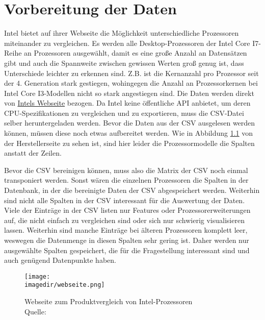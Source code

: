 \chapter{Vorbereitung der Daten}

Intel bietet auf ihrer Webseite die Möglichkeit unterschiedliche Prozessoren miteinander zu vergleichen.
Es werden alle Desktop-Prozessoren der Intel Core I7-Reihe an Prozessoren ausgewählt, damit es eine große Anzahl an Datensätzen gibt und auch die Spannweite zwischen gewissen Werten groß genug ist, dass Unterschiede leichter zu erkennen sind.
Z.B. ist die Kernanzahl pro Prozessor seit der 4. Generation stark gestiegen, wohingegen die Anzahl an Prozessorkernen bei Intel Core I3-Modellen nicht so stark angestiegen sind.
Die Daten werden direkt von \href{https://www.intel.de/content/www/de/de/products/compare.html?productIds=212279,212280,212047,212048,212251,199325,199335,199314,199316,199318,191048,191792,193738,190885,186604,148263,140642,126684,97129,93339,88200,88195,87718,88040,80807,80808,80809,80814,80806,77656,76642,75121,75122,75123,75124,75125,236781,236794,236854,236783,236789,230492,230490,230491,230500,230489,134596,134591,134592,134594,134595,129948,126686,97122,97128,88196}{Intels Webseite} bezogen.
Da Intel keine öffentliche API anbietet, um deren CPU-Spezifikationen zu vergleichen und zu exportieren, muss die CSV-Datei selber heruntergeladen werden. 
Bevor die Daten aus der CSV ausgelesen werden können, müssen diese noch etwas aufbereitet werden.
Wie in Abbildung \ref{fig:intel_webseite} von der Herstellerseite zu sehen ist, sind hier leider die Prozessormodelle die Spalten anstatt der Zeilen. 


Bevor die CSV bereinigen können, muss also die  Matrix der CSV noch einmal transponiert werden.
Sonst wären die einzelnen Prozessoren die Spalten in der Datenbank, in der die bereinigte Daten der CSV abgespeichert werden.
Weiterhin sind nicht alle Spalten in der CSV interessant für die Auswertung der Daten.
Viele der Einträge in der CSV listen nur Features oder Prozessorerweiterungen auf, die nicht einfach zu vergleichen sind oder sich nur schwierig visualisieren lassen.
Weiterhin sind manche Einträge bei älteren Prozessoren komplett leer, weswegen die Datenmenge in diesen Spalten sehr gering ist.
Daher werden nur ausgewählte Spalten gespeichert, die für die Fragestellung interessant sind und auch genügend Datenpunkte haben.

\cleardoublepage

\begin{figure}
	\centering 
	\texttt{[image: \\imagedir/webseite.png]} 
	\captionsetup{format=hang}
	\caption[Webseite von Intel]{\label{fig:intel_webseite}Webseite zum Produktvergleich von Intel-Prozessoren \\Quelle: \cite{i7_intel_2024}}
\end{figure}

